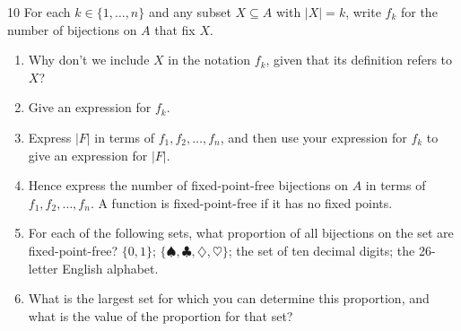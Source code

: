 \documentclass[11pt]{article}
\begin{document}
\begin{exercise}{10}
    For each $k\in\{1,\dots,n\}$ and any subset $X\subseteq A$ with
    $|X|=k$, write $f_k$ for the number of bijections on $A$ that fix
    $X$.
    \begin{enumerate}[label=(\alph*)]
        \item Why don't we include $X$ in the notation $f_k$, given
            that its definition refers to $X$?
        \item Give an expression for $f_k$.
        \item Express $|F|$ in terms of $f_1,f_2,\dots,f_n$, and then
            use your expression for $f_k$ to give an expression for
            $|F|$.
        \item Hence express the number of fixed-point-free
            bijections on $A$ in terms of $f_1,f_2,\dots,f_n$. A
            function is fixed-point-free if it has no fixed points.
        \item For each of the following sets, what proportion of all
            bijections on the set are fixed-point-free?
            $\{0,1\}$; $\{\spadesuit,\clubsuit,\diamondsuit,
            \heartsuit\}$; the set of ten decimal digits; the
            26-letter English alphabet.
        \item What is the largest set for which you can determine
            this proportion, and what is the value of the proportion
            for that set?
    \end{enumerate}
\end{exercise}
\begin{solution}[(a)]

\end{solution}
\begin{solution}[(b)]

\end{solution}
\begin{solution}[(c)]

\end{solution}
\begin{solution}[(d)]

\end{solution}
\begin{solution}[(e)]

\end{solution}
\begin{solution}[(f)]

\end{solution}
\end{document}
